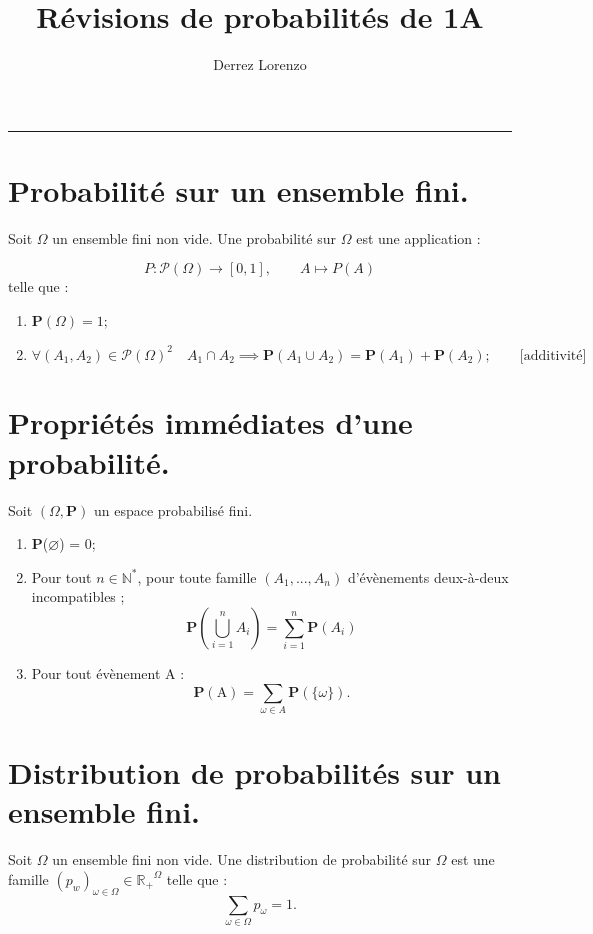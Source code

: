\documentclass{article}
\title{\textbf{Révisions de probabilités de 1A}}
\author{Derrez Lorenzo}
\begin{document}
\maketitle

\rule{\textwidth}{0.4pt}  %

\section{Probabilité sur un ensemble fini.}

Soit $\Omega$ un ensemble fini non vide. Une probabilité sur $\Omega$
est une application : 

$$ 
P : \mathcal{P}(\Omega) \longrightarrow [0,1], 
\qquad 
A \longmapsto P(A)
$$
telle que : 
\begin{enumerate}[label=(\alph*)]
    \item $ \textbf{P}(\Omega) = 1; $
    \item $ \forall (A_1, A_2) \in \mathcal{P}(\Omega)^2 \quad A_1 \cap A_2 \implies \textbf{P}(A_1 \cup A_2) = \textbf{P}(A_1) + \textbf{P}(A_2); \qquad \text{[additivité]} $  
\end{enumerate}

\section{Propriétés immédiates d'une probabilité.}

Soit $(\Omega, \textbf{P})$ un espace probabilisé fini. 
\begin{enumerate}[label=(\alph*)]
    \item \textbf{P}($\varnothing$) = 0; 
    \item Pour tout $n \in \mathbb{N}^*$, pour toute famille $ (A_1, ..., A_n) $ d'évènements deux-à-deux incompatibles ; 
    \[ \textbf{P}( \bigcup_{i=1}^{n} A_i ) =  \sum_{i=1}^{n} \textbf{P}( A_i ) \]
    \item Pour tout évènement A : 
    \[\mathbf{P}(\text{A}) = \sum_{\omega \in A}\mathbf{P}(\{\omega\}) . \]
\end{enumerate}

\section{Distribution de probabilités sur un ensemble fini.}

Soit $ \Omega $ un ensemble fini non vide. Une distribution de probabilité sur $\Omega$ est une famille $(p_w)_{\omega \in \Omega} \in \mathbb{R_+}^{\Omega}$ telle que :
\[\sum_{\omega \in \Omega}p_{\omega} = 1.\]
\end{document}
